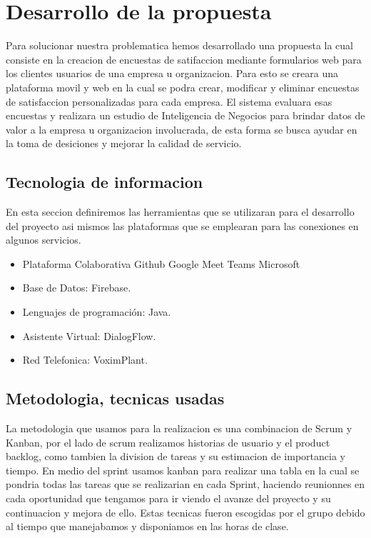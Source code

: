 \documentclass[twoside,twocolumn]{article}
\begin{document}
\section{Desarrollo de la propuesta}
Para solucionar nuestra problematica hemos desarrollado una propuesta la cual consiste en la creacion de encuestas de satifaccion mediante formularios web para los clientes usuarios de una empresa u organizacion. Para esto se creara una plataforma movil y web en la cual se podra crear, modificar y eliminar encuestas de satisfaccion personalizadas para cada empresa. El sistema evaluara esas encuestas y realizara un estudio de Inteligencia de Negocios para brindar datos de valor a la empresa u organizacion involucrada, de esta forma se busca ayudar en la toma de desiciones y mejorar la calidad de servicio.

\subsection{Tecnologia de informacion}
En esta seccion definiremos las herramientas que se utilizaran para el desarrollo del proyecto asi mismos las plataformas que se emplearan para las conexiones en algunos servicios.
\begin{itemize}
\item Plataforma Colaborativa
\subitem Github
\subitem Google Meet
\subitem Teams Microsoft
\item Base de Datos:
\subitem Firebase.
\item Lenguajes de programación:
\subitem Java.
\item Asistente Virtual:
\subitem DialogFlow.
\item Red Telefonica:
\subitem VoximPlant.
\end{itemize}

\subsection{Metodologia, tecnicas usadas}
La metodologia que usamos para la realizacion es una combinacion de Scrum y Kanban, por el lado de scrum realizamos historias de usuario y el product backlog, como tambien la division de tareas y su estimacion de importancia y tiempo. En medio del sprint usamos kanban para realizar una tabla en la cual se pondria todas las tareas que se realizarian en cada Sprint, haciendo reunionnes en cada oportunidad que tengamos para ir viendo el avanze del proyecto y su continuacion y mejora de ello. Estas tecnicas fueron escogidas por el grupo debido al tiempo que manejabamos y disponiamos en las horas de clase.
\end{document}
